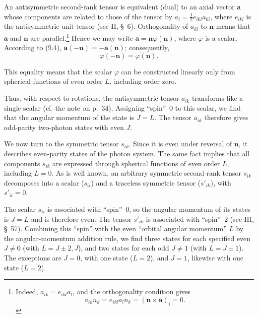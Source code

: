 An antisymmetric second-rank tensor is equivalent (dual) to an axial vector $\mathbf{a}$ whose components are related to those of the tensor by $a_i=\tfrac{1}{2}e_{ikl}a_{kl}$, where $e_{ikl}$ is the antisymmetric unit tensor (see II, \S~6). Orthogonality of $a_{kl}$ to $\mathbf{n}$ means that $\mathbf{a}$ and $\mathbf{n}$ are parallel.\footnote{Indeed, $a_{ik}=e_{ikl}a_l$, and the orthogonality condition gives
\[
a_{ik}n_k=e_{ikl}a_l n_k=(\mathbf{n}\times\mathbf{a})_i=0.
\]} Hence we may write $\mathbf{a}=\mathbf{n}\varphi(\mathbf{n})$, where $\varphi$ is a scalar. According to (9.4), $\mathbf{a}(-\mathbf{n})=-\mathbf{a}(\mathbf{n})$; consequently,
\[
\varphi(-\mathbf{n})=\varphi(\mathbf{n}).
\]

This equality means that the scalar $\varphi$ can be constructed linearly only from spherical functions of even order $L$, including order zero.

Thus, with respect to rotations, the antisymmetric tensor $a_{ik}$ transforms like a single scalar (cf. the note on p.~34). Assigning ``spin''~0 to this scalar, we find that the angular momentum of the state is $J=L$. The tensor $a_{ik}$ therefore gives odd-parity two-photon states with even $J$.

We now turn to the symmetric tensor $s_{ik}$. Since it is even under reversal of $\mathbf{n}$, it describes even-parity states of the photon system. The same fact implies that all components $s_{ik}$ are expressed through spherical functions of even order $L$, including $L=0$. As is well known, an arbitrary symmetric second-rank tensor $s_{ik}$ decomposes into a scalar ($s_{ii}$) and a traceless symmetric tensor ($s'_{ik}$), with $s'_{ii}=0$.

The scalar $s_{ii}$ is associated with ``spin''~0, so the angular momentum of its states is $J=L$ and is therefore even. The tensor $s'_{ik}$ is associated with ``spin''~2 (see III, \S~57). Combining this ``spin'' with the even ``orbital angular momentum'' $L$ by the angular-momentum addition rule, we find three states for each specified even $J\ne0$ (with $L=J\pm2,J$), and two states for each odd $J\ne1$ (with $L=J\pm1$). The exceptions are $J=0$, with one state ($L=2$), and $J=1$, likewise with one state ($L=2$).


